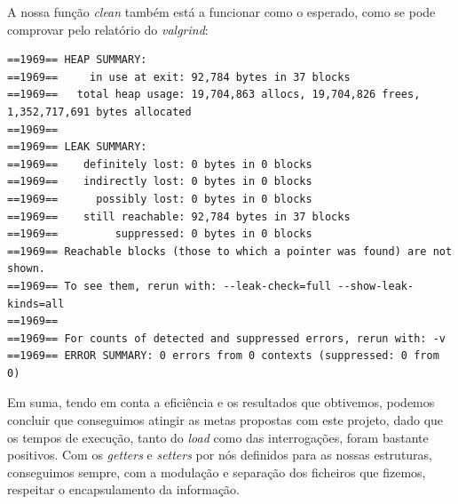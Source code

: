 \documentclass[a4paper, 11pt, oneside]{article}
\begin{document}
A nossa função \textit{clean} também está a funcionar como o esperado, como se pode comprovar pelo relatório do \textit{valgrind}:
\begin{verbatim}
==1969== HEAP SUMMARY:
==1969==     in use at exit: 92,784 bytes in 37 blocks
==1969==   total heap usage: 19,704,863 allocs, 19,704,826 frees, 
1,352,717,691 bytes allocated
==1969== 
==1969== LEAK SUMMARY:
==1969==    definitely lost: 0 bytes in 0 blocks
==1969==    indirectly lost: 0 bytes in 0 blocks
==1969==      possibly lost: 0 bytes in 0 blocks
==1969==    still reachable: 92,784 bytes in 37 blocks
==1969==         suppressed: 0 bytes in 0 blocks
==1969== Reachable blocks (those to which a pointer was found) are not shown.
==1969== To see them, rerun with: --leak-check=full --show-leak-kinds=all
==1969== 
==1969== For counts of detected and suppressed errors, rerun with: -v
==1969== ERROR SUMMARY: 0 errors from 0 contexts (suppressed: 0 from 0)
\end{verbatim}

Em suma, tendo em conta a eficiência e os resultados que obtivemos, podemos concluir que conseguimos atingir as metas propostas com este projeto, dado que os tempos de execução, tanto do \textit{load} como das interrogações, foram bastante positivos. Com os \textit{getters} e \textit{setters} por nós definidos para as nossas estruturas, conseguimos sempre, com a modulação e separação dos ficheiros que fizemos, respeitar o encapsulamento da informação.
\end{document}
